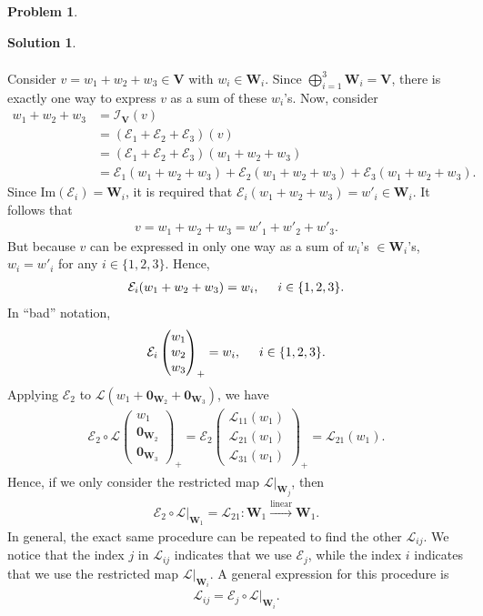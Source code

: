 \documentclass{article}
\theoremstyle{definition}
\newtheorem*{prob*}{Problem}
\newtheorem*{sln*}{Solution}
\newcommand{\V}{\mathbf{V}}
\newcommand{\W}{\mathbf{W}}
\newcommand{\lag}{\mathcal{L}}
\newcommand{\E}{\mathcal{E}}
\newcommand{\ima}{\text{Im}}
\newcommand{\lin}{\overset{\text{linear}}{\longrightarrow}}
\begin{document}
\begin{prob*}
\begin{sln*}
\begin{enumerate}
\begin{align*}
			\end{align*}
			Consider $v = w_1 + w_2 + w_3\in \V$ with $w_i \in \W_i$. Since $\bigoplus^3_{i=1}\W_i = \V$, there is exactly one way to express $v$ as a sum of these $w_i$'s. Now, consider
			\begin{align*}
			w_1 + w_2 +w_3 &= \mathcal{I}_\V(v)\\
			&= (\E_1 + \E_2 + \E_3)(v)\\
			&= (\E_1 + \E_2 + \E_3)(w_1 + w_2 + w_3)\\
			&= \E_1(w_1 + w_2 + w_3) + \E_2(w_1 + w_2 + w_3) + \E_3(w_1 + w_2 + w_3).
			\end{align*} 
			Since $\ima(\E_i) = \W_i$, it is required that $\E_i(w_1 + w_2 + w_3) = w'_i \in \W_i$. It follows that
			\begin{align*}
			v = w_1 + w_2 +w_3 = w'_1 + w'_2 +w'_3.
			\end{align*}
			But because $v$ can be expressed in only one way as a sum of $w_i$'s $\in \W_i$'s, $w_i = w'_i$ for any $i\in \{1,2,3\}$. Hence,
			\begin{align*}
			\E_i(w_1 + w_2 +w_3) = w_i, \hspace{0.5cm} i \in \{1,2,3\}.
			\end{align*}
			In ``bad'' notation, 
			\begin{align*}
			\E_i \begin{pmatrix}
			w_1\\w_2\\w_3
			\end{pmatrix}_+ = w_i, \hspace{0.5cm} i \in \{1,2,3\}.
			\end{align*}
			Applying $\E_2$ to $\lag(w_1 + \mathbf{0}_{\W_2} + \mathbf{0}_{\W_3})$, we have
			\begin{align*}
			\E_2\circ \lag \begin{pmatrix}
			w_1\\ \mathbf{0}_{\W_2} \\ \mathbf{0}_{\W_3}
			\end{pmatrix}_+ = \E_2\begin{pmatrix}
			\lag_{11}(w_1)\\
			\lag_{21}(w_1)\\
			\lag_{31}(w_1)
			\end{pmatrix}_+ =  \lag_{21}(w_1).
			\end{align*}
			Hence, if we only consider the restricted map $\lag\big\vert_{\W_j}$, then
			\begin{align*}
			\E_2 \circ \lag\bigg\vert_{\W_1} = \lag_{21} : \W_1 \lin \W_1.
			\end{align*}
			In general, the exact same procedure can be repeated to find the other $\lag_{ij}$. We notice that the index $j$ in $\lag_{ij}$ indicates that we use $\E_j$, while the index $i$ indicates that we use the restricted map $\lag\big\vert_{\W_i}$. A general expression for this procedure is
			\begin{align*}
			\lag_{ij} = \E_j \circ \lag\bigg\vert_{\W_i}.
			\end{align*}
			

\end{enumerate}
\end{sln*}
\end{prob*}
\end{document}
